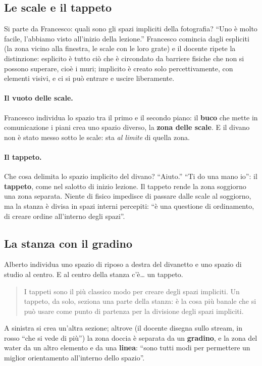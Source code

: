 \subsection{Le scale e il tappeto}

Si parte da Francesco: quali sono gli spazi impliciti della fotografia? ``Uno è molto
facile, l'abbiamo visto all'inizio della lezione.'' Francesco comincia dagli espliciti
(la zona vicino alla finestra, le scale con le loro grate) e il docente ripete la
distinzione: esplicito è tutto ciò che è circondato da barriere fisiche che non si possono
superare, cioè i muri; implicito è creato solo percettivamente, con elementi visivi, e ci
si può entrare e uscire liberamente.

\paragraph{Il vuoto delle scale.} Francesco individua lo spazio tra il primo e il secondo
piano: il \textbf{buco} che mette in comunicazione i piani crea uno spazio diverso, la
\textbf{zona delle scale}. E il divano non è stato messo sotto le scale: sta \emph{al
limite} di quella zona.

\paragraph{Il tappeto.} Che cosa delimita lo spazio implicito del divano? ``Aiuto.''
``Ti do una mano io'': il \textbf{tappeto}, come nel salotto di inizio lezione. Il tappeto
rende la zona soggiorno una zona separata. Niente di fisico impedisce di passare dalle
scale al soggiorno, ma la stanza è divisa in spazi interni percepiti: ``è una questione di
ordinamento, di creare ordine all'interno degli spazi''.

\subsection{La stanza con il gradino}

Alberto individua uno spazio di riposo a destra del divanetto e uno spazio di studio al
centro. E al centro della stanza c'è\ldots{} un tappeto.
\begin{quote}
I tappeti sono il più classico modo per creare degli spazi impliciti. Un tappeto, da
solo, seziona una parte della stanza: è la cosa più banale che si può usare come punto di
partenza per la divisione degli spazi impliciti.
\end{quote}
A sinistra si crea un'altra sezione; altrove (il docente disegna sullo stream, in rosso
``che si vede di più'') la zona doccia è separata da un \textbf{gradino}, e la zona del
water da un altro elemento e da una \textbf{linea}: ``sono tutti modi per permettere un
miglior orientamento all'interno dello spazio''.

